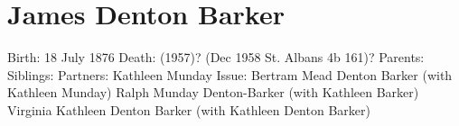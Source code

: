 \section{James Denton Barker}\label{James_Denton_Barker}

Birth: 	18 July 1876
Death: 	(1957)? (Dec 1958 St. Albans 4b 161)?
Parents: 	
Siblings: 	
Partners: 	Kathleen Munday
Issue: 	Bertram Mead Denton Barker (with Kathleen Munday)
Ralph Munday Denton-Barker (with Kathleen Barker)
Virginia Kathleen Denton Barker (with Kathleen Denton Barker)
